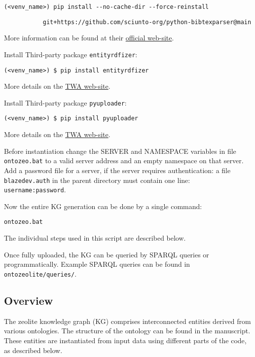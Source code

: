 \documentclass{article}
\begin{document}
\hspace{1cm}
\verb|(<venv_name>) pip install --no-cache-dir --force-reinstall|

\verb|           git+https://github.com/sciunto-org/python-bibtexparser@main|

More information can be found at their 
\href{https://github.com/sciunto-org/python-bibtexparser}{official web-site}.

Install Third-party package \texttt{entityrdfizer}:

\hspace{1cm}
\verb|(<venv_name>) $ pip install entityrdfizer|

More details on the
\href{https://github.com/cambridge-cares/TheWorldAvatar/tree/main/EntityRDFizer}{TWA web-site}.

Install Third-party package \texttt{pyuploader}:

\hspace{1cm}
\verb|(<venv_name>) $ pip install pyuploader|

More details on the 
\href{https://github.com/cambridge-cares/TheWorldAvatar/tree/main/JPS_BASE_LIB/python_uploader}{TWA web-site}.

Before instantiation change the SERVER and NAMESPACE 
variables in file \texttt{ontozeo.bat} 
to a valid server address and an empty namespace on that server.
Add a password file for a server, if the server requires authentication:
a file \texttt{blazedev.auth} in the parent directory must contain one line: \texttt{username:password}.

Now the entire KG generation can be done by a single command:

\hspace{1cm}
\texttt{ontozeo.bat}

The individual steps used in this script are described below. 

Once fully uploaded, the KG can be queried by SPARQL queries or programmatically.
Example SPARQL queries can be found in \texttt{ontozeolite/queries/}.

\subsection{Overview}
\label{sec:zeolite_data_overview}

The zeolite knowledge graph (KG) comprises interconnected entities derived from various ontologies.
The structure of the ontology can be found in the manuscript.
These entities are instantiated from input data using different parts of the code, as described below. 
\end{document}

